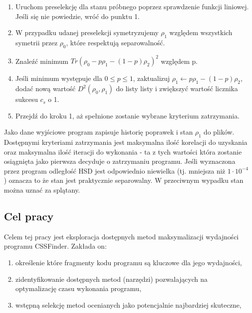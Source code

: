 \documentclass[11pt, a4paper]{article}
\begin{document}
\begin{sloppypar}
\begin{enumerate}
      \item Uruchom preselekcję dla stanu próbnego poprzez sprawdzenie funkcji liniowej.
        Jeśli się nie powiedzie, wróć do punktu 1.

      \item W przypadku udanej preselekcji symetryzujemy $\rho_{1}$ względem wszystkich symetrii
        przez $\rho_{0}$, które respektują separowalność.

      \item Znaleźć minimum $Tr(\rho_{0}- p\rho_{1}- (1 - p)\rho_{2})^{2}$ względem p.

      \item Jeśli minimum występuje dla $0 \le p \le 1$, zaktualizuj
        $\rho_{1}\leftarrow p\rho_{1}- (1 - p)\rho_{2}$, dodać nową wartość $D^{2}(\rho_{0}
        , \rho_{1})$ do listy listy i zwiększyć wartość licznika sukcesu $c_{s}$ o 1.

      \item Przejdź do kroku 1, aż spełnione zostanie wybrane kryterium zatrzymania.
    \end{enumerate}

    Jako dane wyjściowe program zapisuje historię poprawek i stan $\rho_{1}$ do plików.
    Dostępnymi kryteriami zatrzymania jest maksymalna ilość korelacji do uzyskania oraz
    maksymalna ilość iteracji do wykonania - ta z tych wartości która zostanie
    osiągnięta jako pierwsza decyduje o zatrzymaniu programu. Jeśli wyznaczona przez program
    odległość HSD jest odpowiednio niewielka (tj. mniejsza niż $1 \cdot 10^{-4}$)
    oznacza to że stan jest praktycznie separowalny. W przeciwnym wypadku stan można uznać
    za splątany.

    \subsection{Cel pracy}
    Celem tej pracy jest eksploracja dostępnych metod maksymalizacji wydajności programu
    CSSFinder. Zakłada on:
    \begin{enumerate}
      \item określenie które fragmenty kodu programu są kluczowe dla jego wydajności,

      \item zidentyfikowanie dostępnych metod (narzędzi) pozwalających na optymalizację czasu
        wykonania programu,

      \item wstępną selekcję metod ocenianych jako potencjalnie najbardziej skuteczne,


\end{enumerate}
\end{sloppypar}
\end{document}
